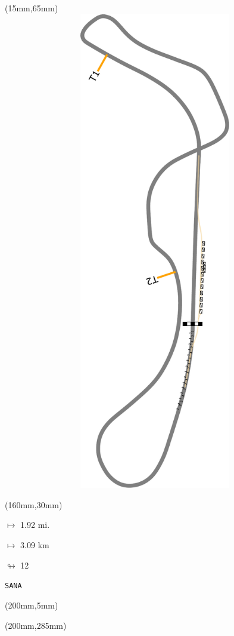 \begin{textblock*}{185mm}(15mm,65mm)%
\centering
\mbox{\includegraphics[width=185mm,height=210mm,keepaspectratio]{PT/SANA.pdf}}
\end{textblock*}
\begin{textblock*}{40mm}(160mm,30mm)%
\Large
\par$\mapsto$ 1.92 mi.
\par$\mapsto$ 3.09 km
\par$\looparrowright$ 12
\par\hfill\tiny\tt SANA\\
\end{textblock*}
\begin{textblock*}{20mm}(200mm,5mm)%
\fbox{\thepage}
\label{SANA}
\end{textblock*}
\begin{textblock*}{20mm}(200mm,285mm)%
\fbox{\thepage}
\end{textblock*}


